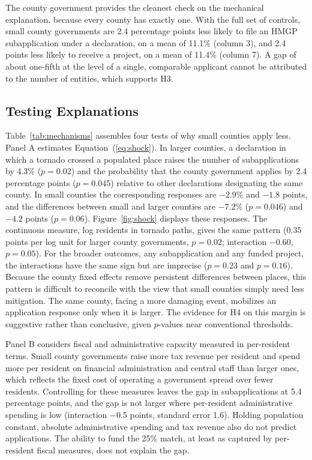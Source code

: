 \documentclass[12pt]{article}
\begin{document}
The county government provides the cleanest check on the mechanical explanation, because every county has exactly one. With the full set of controls, small county governments are 2.4 percentage points less likely to file an HMGP subapplication under a declaration, on a mean of 11.1\% (column 3), and 2.4 points less likely to receive a project, on a mean of 11.4\% (column 7). A gap of about one-fifth at the level of a single, comparable applicant cannot be attributed to the number of entities, which supports H3.

\subsection{Testing Explanations}

Table~\ref{tab:mechanisms} assembles four tests of why small counties apply less. Panel A estimates Equation~(\ref{eq:shock}). In larger counties, a declaration in which a tornado crossed a populated place raises the number of subapplications by 4.3\% ($p = 0.02$) and the probability that the county government applies by 2.4 percentage points ($p = 0.045$) relative to other declarations designating the same county. In small counties the corresponding responses are $-2.9\%$ and $-1.8$ points, and the differences between small and larger counties are $-7.2\%$ ($p = 0.046$) and $-4.2$ points ($p = 0.06$). Figure~\ref{fig:shock} displays these responses. The continuous measure, log residents in tornado paths, gives the same pattern ($0.35$ points per log unit for larger county governments, $p = 0.02$; interaction $-0.60$, $p = 0.05$). For the broader outcomes, any subapplication and any funded project, the interactions have the same sign but are imprecise ($p = 0.23$ and $p = 0.16$). Because the county fixed effects remove persistent differences between places, this pattern is difficult to reconcile with the view that small counties simply need less mitigation. The same county, facing a more damaging event, mobilizes an application response only when it is larger. The evidence for H4 on this margin is suggestive rather than conclusive, given $p$-values near conventional thresholds.

Panel B considers fiscal and administrative capacity measured in per-resident terms. Small county governments raise more tax revenue per resident and spend more per resident on financial administration and central staff than larger ones, which reflects the fixed cost of operating a government spread over fewer residents. Controlling for these measures leaves the gap in subapplications at 5.4 percentage points, and the gap is not larger where per-resident administrative spending is low (interaction $-0.5$ points, standard error 1.6). Holding population constant, absolute administrative spending and tax revenue also do not predict applications. The ability to fund the 25\% match, at least as captured by per-resident fiscal measures, does not explain the gap.
\end{document}
